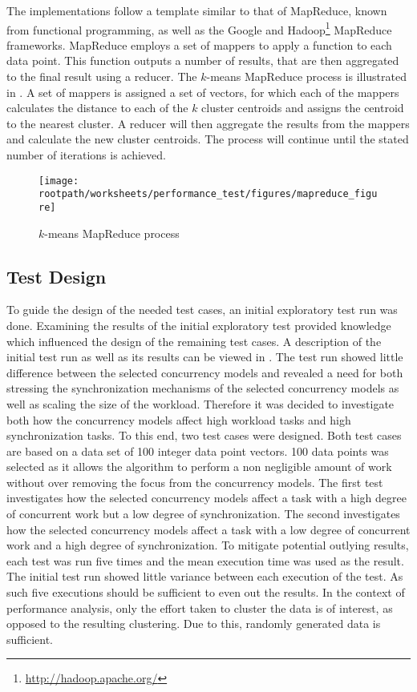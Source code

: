The implementations follow a template similar to that of MapReduce\cite{dean2008mapreduce}, known from functional programming, as well as the Google\cite{dean2008mapreduce} and Hadoop\footnote{\url{http://hadoop.apache.org/}} MapReduce frameworks. MapReduce employs a set of mappers to apply a function to each data point. This function outputs a number of results, that are then aggregated to the final result using a reducer. The $k$-means MapReduce process is illustrated in . A set of mappers is assigned a set of vectors, for which each of the mappers calculates the distance to each of the $k$ cluster centroids and assigns the centroid to the nearest cluster. A reducer will then aggregate the results from the mappers and calculate the new cluster centroids. The process will continue until the stated number of iterations is achieved.

\begin{figure}
\centering
\texttt{[image: \\rootpath/worksheets/performance\_test/figures/mapreduce\_figure]}
\caption{$k$-means MapReduce process}\label{fig:kmeans_mapreduce}
\end{figure}



\subsection{Test Design}
\label{sec:performance_test_design}
To guide the design of the needed test cases, an initial exploratory test run was done. Examining the results of the initial exploratory test provided knowledge which influenced the design of the remaining test cases. A description of the initial test run as well as its results can be viewed in . The test run showed little difference between the selected concurrency models and revealed a need for both stressing the synchronization mechanisms of the selected concurrency models as well as scaling the size of the workload. Therefore it was decided to investigate both how the concurrency models affect high workload tasks and high synchronization tasks. To this end, two test cases were designed. Both test cases are based on a data set of 100 integer data point vectors. 100 data points was selected as it allows the algorithm to perform a non negligible amount of work without over removing the focus from the concurrency models. The first test investigates how the selected concurrency models affect a task with a high degree of concurrent work but a low degree of synchronization. The second investigates how the selected concurrency models affect a task with a low degree of concurrent work and a high degree of synchronization. To mitigate potential outlying results, each test was run five times and the mean execution time was used as the result. The initial test run showed little variance between each execution of the test. As such five executions should be sufficient to even out the results. In the context of performance analysis, only the effort taken to cluster the data is of interest, as opposed to the resulting clustering. Due to this, randomly generated data is sufficient.

